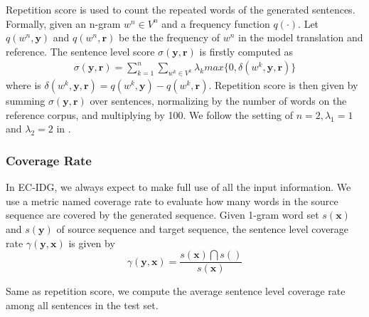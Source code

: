 \documentclass[letterpaper]{article} %
\begin{document}
Repetition score is used to count the repeated words of the generated sentences. Formally, given an n-gram $w^n \in { V }^{ n }$ and a frequency function $q(\cdot)$. Let $q(w^n,\textbf{y})$ and $q(w^n,\textbf{r})$ be the the frequency of $w^n$ in the model translation and reference. The sentence level score $\sigma (\textbf{y},\textbf{r})$ is firstly computed as
\begin{align}
\label{equ:sentence-level score}
\sigma (\textbf{y},\textbf{r})=\sum^n_{k=1}{\sum_{w^k\in V^k }{\lambda_k  max\{ 0, \delta(w^k,\textbf{y},\textbf{r} )\}}}
\end{align}
where is $\delta(w^k,\textbf{y},\textbf{r}) = q(w^k,\textbf{y})-q(w^k,\textbf{r})$.
Repetition score is then given by summing $\sigma(\textbf{y}, \textbf{r})$ over sentences, normalizing by the number of words on the reference corpus, and multiplying by 100. We follow the setting of $n=2, \lambda_{1}=1$ and $\lambda_{2}=2$ in \cite{malaviya2018sparse}.
\subsubsection{Coverage Rate}
In EC-IDG, we always expect to make full use of all the input information. 
We use a metric named coverage rate to evaluate how many words in the source sequence are covered by the generated sequence.
Given 1-gram word set $ {s(\textbf{x})}$ and ${s(\textbf{y})}$ of source sequence and target sequence,
 the sentence level coverage rate $\gamma(\textbf{y}, \textbf{x})$ is given by
\begin{equation}
\label{coverage rate}
\gamma(\textbf{y}, \textbf{x}) = \frac {s(\textbf{x})\bigcap s(\textbf{})}{s(\textbf{x})}
\end{equation}

Same as repetition score, we compute the average sentence level coverage rate among all sentences in the test set.
\end{document}
